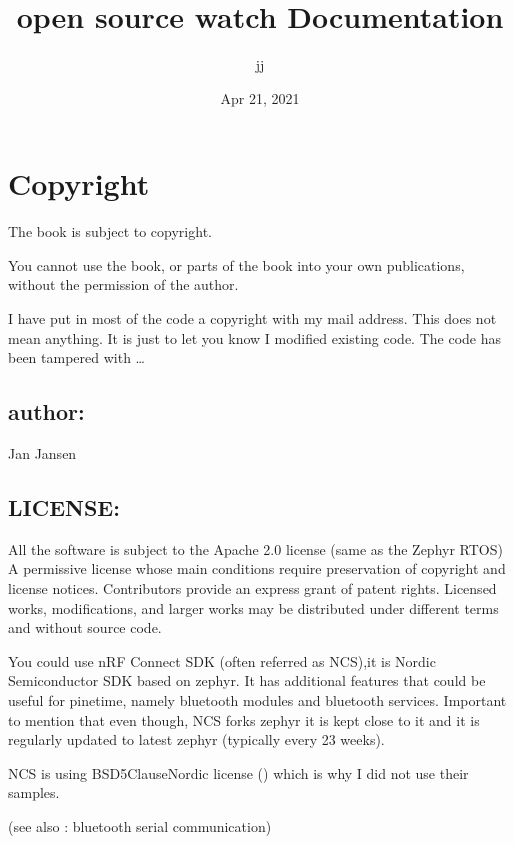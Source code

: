 \documentclass[letterpaper,10pt,english]{sphinxmanual}
\title{open source watch Documentation}
\date{Apr 21, 2021}
\author{jj}
\begin{document}
\pagestyle{empty}
\sphinxmaketitle
\pagestyle{plain}
\sphinxtableofcontents
\pagestyle{normal}
\label{\detokenize{index::doc}}
\noindent{}




\chapter{Copyright}
\label{\detokenize{copyright:copyright}}\label{\detokenize{copyright::doc}}
The book is subject to copyright.

You cannot use the book, or parts of the book into your own publications, without the permission of the author.

I have put in most of the code a copyright with my mail address.
This does not mean anything. It is just to let you know I modified existing code. The code has been tampered with …


\section{author:}
\label{\detokenize{copyright:author}}
Jan Jansen


\section{LICENSE:}
\label{\detokenize{copyright:license}}
All the software is subject to the Apache 2.0 license (same as the Zephyr RTOS)
A permissive license whose main conditions require preservation of copyright and license notices. Contributors provide an express grant of patent rights. Licensed works, modifications, and larger works may be distributed under different terms and without source code.

You could use nRF Connect SDK (often referred as NCS),it is Nordic Semiconductor SDK based on zephyr. It has additional features that could be useful for pinetime, namely bluetooth modules and bluetooth services. Important to mention that even though, NCS forks zephyr it is kept close to it and it is regularly updated to latest zephyr (typically every 2\sphinxhyphen{}3 weeks).

NCS is using BSD\sphinxhyphen{}5\sphinxhyphen{}Clause\sphinxhyphen{}Nordic license ()
which is why I did not use their samples.

(see also : bluetooth serial communication)
\end{document}
